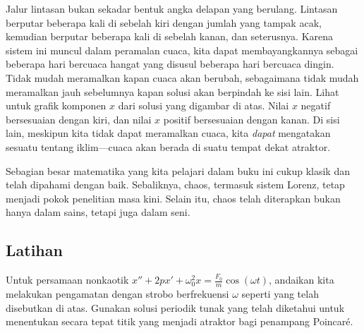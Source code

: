 Jalur lintasan bukan sekadar bentuk angka delapan yang berulang.  Lintasan
berputar beberapa kali di sebelah kiri dengan jumlah yang tampak acak, kemudian
berputar beberapa kali di sebelah kanan, dan seterusnya.  Karena sistem ini
muncul dalam peramalan cuaca, kita dapat membayangkannya sebagai beberapa hari
bercuaca hangat yang disusul beberapa hari bercuaca dingin.  Tidak mudah
meramalkan kapan cuaca akan berubah, sebagaimana tidak mudah meramalkan jauh
sebelumnya kapan solusi akan berpindah ke sisi lain.  Lihat
 untuk grafik komponen $x$ dari solusi yang
digambar di atas.  Nilai $x$ negatif bersesuaian dengan  kiri,
dan nilai $x$ positif bersesuaian dengan  kanan.  Di sisi lain,
meskipun kita tidak dapat meramalkan cuaca, kita \emph{dapat} mengatakan
sesuatu tentang iklim---cuaca akan berada di suatu tempat dekat atraktor.

Sebagian besar matematika yang kita pelajari dalam buku ini cukup klasik dan
telah dipahami dengan baik.  Sebaliknya, chaos, termasuk sistem Lorenz, tetap
menjadi pokok penelitian masa kini.  Selain itu, chaos telah diterapkan bukan
hanya dalam sains, tetapi juga dalam seni.

\begin{myfig}
\capstart
{}
\caption{Grafik komponen $x(t)$ dari solusi.
\label{nlin:lorenz-graphx}}
\end{myfig}

\subsection{Latihan}

\begin{exercise}
Untuk persamaan nonkaotik
$x''+2p x' + \omega_0^2 x = \frac{F_0}{m} \cos (\omega t)$, andaikan kita
melakukan pengamatan dengan strobo berfrekuensi $\omega$ seperti yang telah
disebutkan di atas.  Gunakan solusi periodik tunak yang telah diketahui untuk
menentukan secara tepat titik yang menjadi atraktor bagi penampang Poincar\'e.
\end{exercise}


